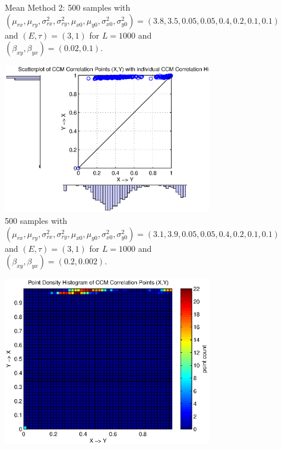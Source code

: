 \documentclass[a4paper,11pt]{article}
\begin{document}
\begin{figure}[h!t]
\begin{subfigure}[b]{0.4\textwidth}
\caption{Mean Method 2: 500 samples with $\left(\mu_{rx},\mu_{ry},\sigma^2_{rx},\sigma^2_{ry},\mu_{x0},\mu_{y0},\sigma^2_{x0},\sigma^2_{y0}\right) = \left(3.8,3.5,0.05,0.05,0.4,0.2,0.1,0.1\right)$ and $\left(E,\tau\right)=\left(3,1\right)$ for $L=1000$ and $(\beta_{xy},\beta_{yx})=(0.02,0.1)$.}
\end{subfigure}
\caption{}
\end{figure}

\begin{figure}[h!t]
\centering
\begin{subfigure}[b]{0.4\textwidth}
\label{fig:SugEx2wCCMpoints_scatterhist}
\includegraphics[scale=0.55]{graphics/SugEx2wCCMpoints_scatterhist.eps}
\caption{500 samples with $\left(\mu_{rx},\mu_{ry},\sigma^2_{rx},\sigma^2_{ry},\mu_{x0},\mu_{y0},\sigma^2_{x0},\sigma^2_{y0}\right) = \left(3.1,3.9,0.05,0.05,0.4,0.2,0.1,0.1\right)$ and $\left(E,\tau\right)=\left(3,1\right)$ for $L=1000$ and $(\beta_{xy},\beta_{yx})=(0.2,0.002)$.}
\end{subfigure}
\begin{subfigure}[b]{0.4\textwidth}
\label{fig:SugEx2wCCMpoints_densityhist}
\includegraphics[scale=0.55]{graphics/SugEx2wCCMpoints_densityhist.eps}

\end{subfigure}
\end{figure}
\end{document}
